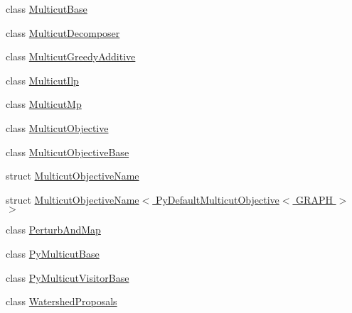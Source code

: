 \begin{DoxyCompactItemize}
\item 
class \hyperlink{classnifty_1_1graph_1_1optimization_1_1multicut_1_1MulticutBase}{Multicut\+Base}
\item 
class \hyperlink{classnifty_1_1graph_1_1optimization_1_1multicut_1_1MulticutDecomposer}{Multicut\+Decomposer}
\item 
class \hyperlink{classnifty_1_1graph_1_1optimization_1_1multicut_1_1MulticutGreedyAdditive}{Multicut\+Greedy\+Additive}
\item 
class \hyperlink{classnifty_1_1graph_1_1optimization_1_1multicut_1_1MulticutIlp}{Multicut\+Ilp}
\item 
class \hyperlink{classnifty_1_1graph_1_1optimization_1_1multicut_1_1MulticutMp}{Multicut\+Mp}
\item 
class \hyperlink{classnifty_1_1graph_1_1optimization_1_1multicut_1_1MulticutObjective}{Multicut\+Objective}
\item 
class \hyperlink{classnifty_1_1graph_1_1optimization_1_1multicut_1_1MulticutObjectiveBase}{Multicut\+Objective\+Base}
\item 
struct \hyperlink{structnifty_1_1graph_1_1optimization_1_1multicut_1_1MulticutObjectiveName}{Multicut\+Objective\+Name}
\item 
struct \hyperlink{structnifty_1_1graph_1_1optimization_1_1multicut_1_1MulticutObjectiveName_3_01PyDefaultMulticutObjective_3_01GRAPH_01_4_01_4}{Multicut\+Objective\+Name$<$ Py\+Default\+Multicut\+Objective$<$ G\+R\+A\+P\+H $>$ $>$}
\item 
class \hyperlink{classnifty_1_1graph_1_1optimization_1_1multicut_1_1PerturbAndMap}{Perturb\+And\+Map}
\item 
class \hyperlink{classnifty_1_1graph_1_1optimization_1_1multicut_1_1PyMulticutBase}{Py\+Multicut\+Base}
\item 
class \hyperlink{classnifty_1_1graph_1_1optimization_1_1multicut_1_1PyMulticutVisitorBase}{Py\+Multicut\+Visitor\+Base}
\item 
class \hyperlink{classnifty_1_1graph_1_1optimization_1_1multicut_1_1WatershedProposals}{Watershed\+Proposals}
\end{DoxyCompactItemize}
